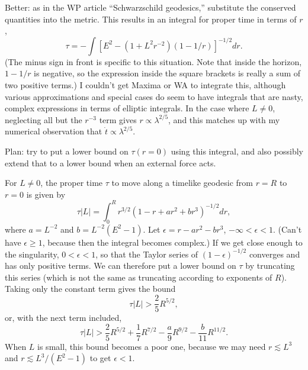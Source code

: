 \documentclass{article}
\begin{document}
Better: as in the WP article ``Schwarzschild geodesics,'' substitute the conserved quantities
into the metric. This results in an integral for proper time in terms of $r$,
\begin{equation*}
  \tau = -\int \left[E^2-(1+L^2r^{-2})(1-1/r)\right]^{-1/2}dr .
\end{equation*}
(The minus sign in front is specific to this situation.
Note that inside the horizon, $1-1/r$ is negative, so the expression inside the square brackets
is really a sum of two positive terms.)
I couldn't get Maxima or WA to integrate this, although various approximations and special
cases do seem to have integrals that are nasty, complex expressions in terms of elliptic integrals.
In the case where $L\ne0$, neglecting all but the $r^{-3}$ term gives $r\propto\lambda^{2/5}$,
and this matches up with my numerical observation that $\dot{t}\propto \lambda^{2/5}$.

Plan: try to put a lower bound on $\tau(r=0)$ using this integral, and also possibly extend that
to a lower bound when an external force acts.

For $L\ne0$, the proper time $\tau$ to move along a timelike geodesic from $r=R$ to $r=0$ is given by
\begin{equation*}
  \tau|L| = \int_0^R r^{3/2}(1-r+ar^2+br^3)^{-1/2} dr,
\end{equation*}
where $a=L^{-2}$ and $b=L^{-2}(E^2-1)$.
Let $\epsilon=r-ar^2-br^3$, $-\infty < \epsilon<1$. (Can't have $\epsilon\ge1$, because
then the integral becomes complex.) If we get close enough to the singularity, $0<\epsilon<1$,
so that the Taylor series of $(1-\epsilon)^{-1/2}$ converges and has only positive terms.
We can therefore put a lower bound on $\tau$ by truncating this series (which is not the
same as truncating according to exponents of $R$). Taking only the constant term gives
the bound
\begin{equation*}
  \tau|L| > \frac{2}{5}R^{5/2},
\end{equation*}
or, with the next term included,
\begin{equation*}
  \tau|L| > \frac{2}{5}R^{5/2}+\frac{1}{7}R^{7/2}-\frac{a}{9}R^{9/2}-\frac{b}{11}R^{11/2}.
\end{equation*}
When $L$ is small, this bound becomes a poor one, because we may need $r\lesssim L^3$ and
$r\lesssim L^3/(E^2-1)$ to get $\epsilon<1$.
\end{document}
